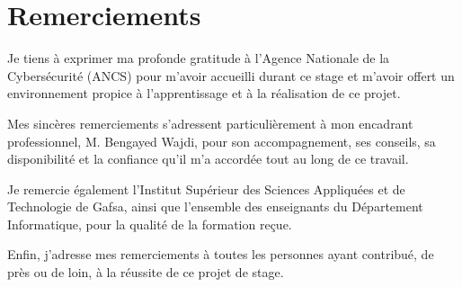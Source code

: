 \chapter*{Remerciements}

Je tiens à exprimer ma profonde gratitude à l'Agence Nationale de la Cybersécurité (ANCS) pour m'avoir accueilli durant ce stage et m'avoir offert un environnement propice à l'apprentissage et à la réalisation de ce projet.

Mes sincères remerciements s'adressent particulièrement à mon encadrant professionnel, M. Bengayed Wajdi, pour son accompagnement, ses conseils, sa disponibilité et la confiance qu'il m'a accordée tout au long de ce travail.

Je remercie également l'Institut Supérieur des Sciences Appliquées et de Technologie de Gafsa, ainsi que l'ensemble des enseignants du Département Informatique, pour la qualité de la formation reçue.

Enfin, j'adresse mes remerciements à toutes les personnes ayant contribué, de près ou de loin, à la réussite de ce projet de stage.